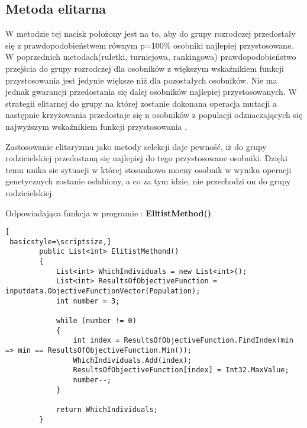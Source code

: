 
\subsection{Metoda elitarna}\label{sec:przygotowanieDokumentu}

W metodzie tej nacisk położony jest na to, aby do grupy rozrodczej przedostały się z prawdopodobieństwem równym p=100\% osobniki najlepiej przystosowane. W poprzednich metodach(ruletki, turniejowa, rankingowa) prawdopodobieństwo przejścia do grupy rozrodczej dla osobników z większym wskaźnikiem funkcji przystosowania jest jedynie większe niż dla pozostałych osobników. Nie ma jednak gwarancji przedostania się dalej osobników najlepiej przystosowanych. W strategii elitarnej do grupy na której zostanie dokonana operacja mutacji a następnie krzyżowania przedostaje się n osobników z populacji odznaczających się najwyższym wskaźnikiem funkcji przystosowania \cite{michal}.\\
\par
Zastosowanie elitaryzmu jako metody selekcji daje pewność, iż do grupy rodzicielskiej przedostaną się najlepiej do tego przystosowane osobniki. Dzięki temu unika sie sytuacji w której stosunkowo mocny osobnik w wyniku operacji genetycznych zostanie osłabiony, a co za tym idzie, nie przechodzi on do grupy rodzicielskiej.\\
\par
Odpowiadająca funkcja w programie : \textbf{ElitistMethod()}

\begin{program}
\begin{lstlisting}[
 basicstyle=\scriptsize,]
        public List<int> ElitistMethond()
        {
            List<int> WhichIndividuals = new List<int>();
            List<int> ResultsOfObjectiveFunction = inputdata.ObjectiveFunctionVector(Population);
            int number = 3;

            while (number != 0)
            {
                int index = ResultsOfObjectiveFunction.FindIndex(min => min == ResultsOfObjectiveFunction.Min());
                WhichIndividuals.Add(index);
                ResultsOfObjectiveFunction[index] = Int32.MaxValue;
                number--;
            }

            return WhichIndividuals;
        }
\end{lstlisting}
\end{program}


